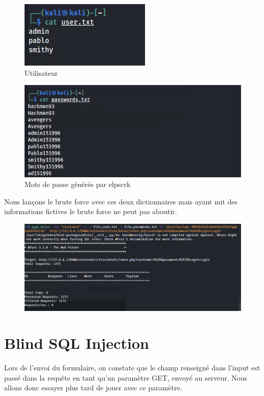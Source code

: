 \documentclass[12pt, oneside]{article}
\begin{document}
\begin{figure}[H]
\centering
\includegraphics[scale=0.4]{Image12}
\caption{Utilisateur}
\end{figure}
\begin{figure}[H]
\centering
\includegraphics[scale=0.4]{Image13}
\caption{Mots de passe générés par elpscrk}
\end{figure}
Nous lançons le brute force avec ces deux dictionnaires mais ayant mit des informations fictives le brute force ne peut pas aboutir.
\begin{figure}[H]
\centering
\includegraphics[scale=0.4]{Image14}
\end{figure}

\section{Blind SQL Injection}

Lors de l'envoi du formulaire, on constate que le champ renseigné dans l'input est passé dans la requête en tant qu'un paramètre GET, envoyé au serveur. Nous allons donc essayer plus tard de jouer avec ce paramètre.
\end{document}
